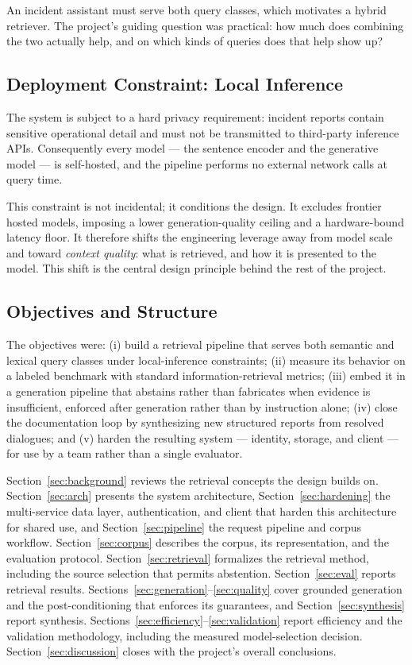 \documentclass[12pt, a4paper]{article}
\begin{document}
An incident assistant must serve both query classes, which motivates a hybrid retriever. The project's guiding question was practical: how much does combining the two actually help, and on which kinds of queries does that help show up?

\subsection{Deployment Constraint: Local Inference}

The system is subject to a hard privacy requirement: incident reports contain sensitive operational detail and must not be transmitted to third-party inference APIs. Consequently every model — the sentence encoder and the generative model — is self-hosted, and the pipeline performs no external network calls at query time.

This constraint is not incidental; it conditions the design. It excludes frontier hosted models, imposing a lower generation-quality ceiling and a hardware-bound latency floor. It therefore shifts the engineering leverage away from model scale and toward \emph{context quality}: what is retrieved, and how it is presented to the model. This shift is the central design principle behind the rest of the project.

\subsection{Objectives and Structure}

The objectives were: (i) build a retrieval pipeline that serves both semantic and lexical query classes under local-inference constraints; (ii) measure its behavior on a labeled benchmark with standard information-retrieval metrics; (iii) embed it in a generation pipeline that abstains rather than fabricates when evidence is insufficient, enforced after generation rather than by instruction alone; (iv) close the documentation loop by synthesizing new structured reports from resolved dialogues; and (v) harden the resulting system — identity, storage, and client — for use by a team rather than a single evaluator.

Section~\ref{sec:background} reviews the retrieval concepts the design builds on. Section~\ref{sec:arch} presents the system architecture, Section~\ref{sec:hardening} the multi-service data layer, authentication, and client that harden this architecture for shared use, and Section~\ref{sec:pipeline} the request pipeline and corpus workflow. Section~\ref{sec:corpus} describes the corpus, its representation, and the evaluation protocol. Section~\ref{sec:retrieval} formalizes the retrieval method, including the source selection that permits abstention. Section~\ref{sec:eval} reports retrieval results. Sections~\ref{sec:generation}--\ref{sec:quality} cover grounded generation and the post-conditioning that enforces its guarantees, and Section~\ref{sec:synthesis} report synthesis. Sections~\ref{sec:efficiency}--\ref{sec:validation} report efficiency and the validation methodology, including the measured model-selection decision. Section~\ref{sec:discussion} closes with the project's overall conclusions.
\end{document}

